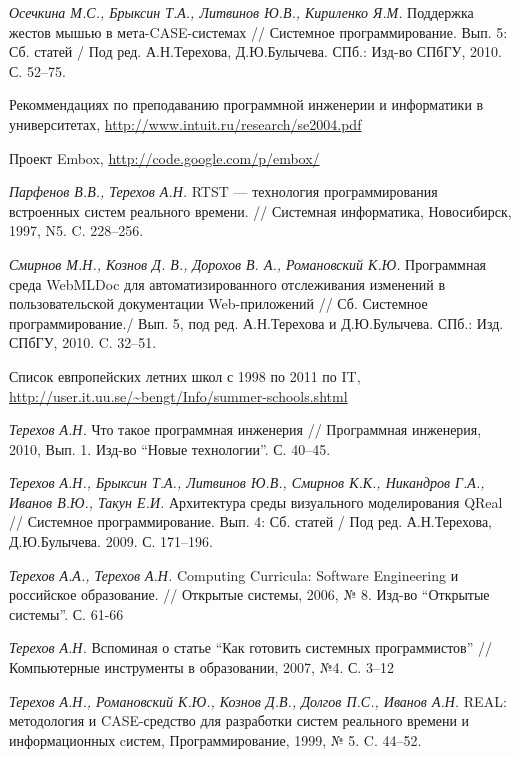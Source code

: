 \documentclass[a4paper]{article}
\begin{document}
\begin{thebibliography}{9001}
  \emph{Осечкина М.С., Брыксин Т.А., Литвинов Ю.В., Кириленко Я.М.} Поддержка жестов мышью в мета-CASE-системах // Системное программирование. Вып. 5: Сб. статей / Под ред. А.Н.Терехова, Д.Ю.Булычева.  СПб.: Изд-во СПбГУ, 2010. С. 52--75.

   Рекоммендациях по преподаванию программной инженерии и информатики в университетах, \url{http://www.intuit.ru/research/se2004.pdf}  

   Проект Embox, \url{http://code.google.com/p/embox/}

   \emph{Парфенов В.В., Терехов А.Н.} RTST --- технология программирования встроенных систем реального времени. // Системная информатика, Новосибирск, 1997, N5. C. 228--256.
  
  \emph{Смирнов М.Н., Кознов Д. В., Дорохов В. А., Романовский К.Ю.} Программная среда WebMLDoc для автоматизированного отслеживания изменений в пользовательской документации Web-приложений // Сб. Системное программирование./ Вып. 5, под ред. А.Н.Терехова и Д.Ю.Булычева. СПб.: Изд. СПбГУ, 2010. C. 32--51.
  
   Список  евпропейских летних школ с 1998 по 2011 по IT, \url{http://user.it.uu.se/~bengt/Info/summer-schools.shtml}

  \emph{Терехов А.Н.} Что такое программная инженерия // Программная инженерия, 2010, Вып. 1. Изд-во ``Новые технологии''. С. 40--45.

   \emph{Терехов А.Н., Брыксин Т.А., Литвинов Ю.В., Смирнов К.К., Никандров  Г.А., Иванов В.Ю., Такун Е.И.} Архитектура среды визуального  моделирования QReal // Системное программирование. Вып. 4: Сб. статей  / Под ред. А.Н.Терехова, Д.Ю.Булычева. 2009. С. 171--196.

  \emph{Терехов А.А., Терехов А.Н.} Computing Curricula: Software Engineering и российское образование. // Открытые системы, 2006, № 8. Изд-во ``Открытые системы''. С. 61-66

  \emph{Терехов А.Н.} Вспоминая о статье ``Как готовить системных программистов'' // Компьютерные инструменты в образовании, 2007, №4. С. 3--12

   \emph{Терехов А.Н., Романовский К.Ю., Кознов Д.В., Долгов П.С., Иванов А.Н.} REAL: методология и CASE-средство для разработки систем реального времени и информационных cистем, Программирование, 1999, № 5. C. 44--52.


\end{thebibliography}
\end{document}
